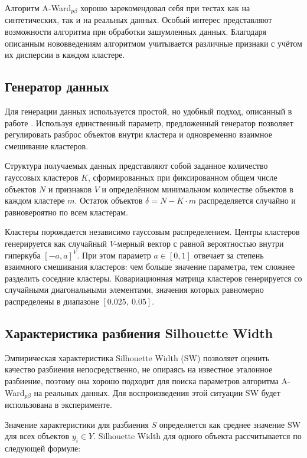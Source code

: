 \documentclass[12pt]{a&t}
\begin{document}
Алгоритм \mbox{A-Ward$ _{p\beta} $} хорошо зарекомендовал себя при тестах как на синтетических, так и на реальных данных. Особый интерес представляют возможности алгоритма при обработки зашумленных данных. Благодаря описанным нововведениям алгоритмом учитывается различные признаки с учётом их дисперсии в каждом кластере. 

\subsection{Генератор данных}\label{sec:data-generation}
Для генерации данных используется простой, но удобный подход, описанный в работе \cite{Kovaleva}. Используя единственный параметр, предложенный генератор позволяет регулировать разброс объектов внутри кластера и одновременно взаимное смешивание кластеров.

Структура получаемых данных представляют собой заданное количество гауссовых кластеров $ K $, сформированных при фиксированном общем числе объектов $ N $ и признаков $ V $ и определённом минимальном количестве объектов в каждом кластере $ m $. Остаток объектов $ \delta = N - K\cdot m $ распределяется случайно и равновероятно по всем кластерам. 

Кластеры порождается независимо гауссовым распределением. Центры кластеров генерируется как случайный $ V $-мерный вектор с равной вероятностью внутри гиперкуба $ [-a,a]^V $. При этом параметр $ a \in [0,1] $ отвечает за степень взаимного смешивания кластеров: чем больше значение параметра, тем сложнее разделить соседние кластеры. Ковариационная матрица кластеров генерируется со случайными диагональными элементами, значения которых равномерно распределены в диапазоне $ [0.025,\:0.05] $.

\subsection{Характеристика разбиения Silhouette Width}\label{sec:sw}
Эмпирическая характеристика Silhouette Width (SW) \cite{SW-Canonical} позволяет оценить качество разбиения непосредственно, не опираясь на известное эталонное разбиение, поэтому она хорошо подходит для поиска параметров алгоритма \mbox{A-Ward$ _{p\beta} $} на реальных данных. Для воспроизведения этой ситуации SW будет использована в эксперименте. 

Значение характеристики для разбиения $ S $ определяется как среднее значение SW для всех объектов $ y_i \in Y $. Silhouette Width для одного объекта рассчитывается по следующей формуле:
\end{document}
